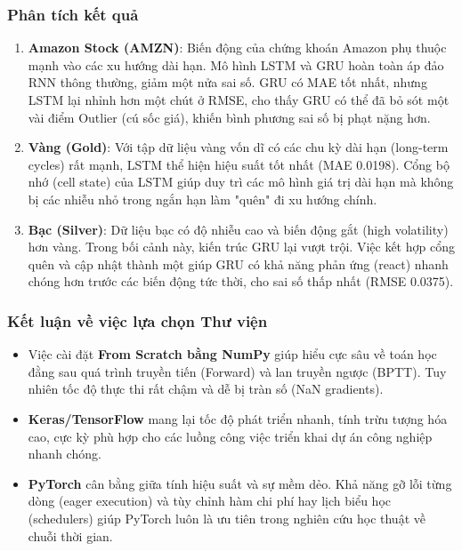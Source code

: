 \subsubsection{Phân tích kết quả}
\begin{enumerate}
    \item \textbf{Amazon Stock (AMZN)}: 
    Biến động của chứng khoán Amazon phụ thuộc mạnh vào các xu hướng dài hạn. Mô hình LSTM và GRU hoàn toàn áp đảo RNN thông thường, giảm một nửa sai số. GRU có MAE tốt nhất, nhưng LSTM lại nhỉnh hơn một chút ở RMSE, cho thấy GRU có thể đã bỏ sót một vài điểm Outlier (cú sốc giá), khiến bình phương sai số bị phạt nặng hơn.
    
    \item \textbf{Vàng (Gold)}:
    Với tập dữ liệu vàng vốn dĩ có các chu kỳ dài hạn (long-term cycles) rất mạnh, LSTM thể hiện hiệu suất tốt nhất (MAE 0.0198). Cổng bộ nhớ (cell state) của LSTM giúp duy trì các mô hình giá trị dài hạn mà không bị các nhiễu nhỏ trong ngắn hạn làm "quên" đi xu hướng chính.
    
    \item \textbf{Bạc (Silver)}:
    Dữ liệu bạc có độ nhiễu cao và biến động gắt (high volatility) hơn vàng. Trong bối cảnh này, kiến trúc GRU lại vượt trội. Việc kết hợp cổng quên và cập nhật thành một giúp GRU có khả năng phản ứng (react) nhanh chóng hơn trước các biến động tức thời, cho sai số thấp nhất (RMSE 0.0375).
\end{enumerate}

\subsubsection{Kết luận về việc lựa chọn Thư viện}
\begin{itemize}
    \item Việc cài đặt \textbf{From Scratch bằng NumPy} giúp hiểu cực sâu về toán học đằng sau quá trình truyền tiến (Forward) và lan truyền ngược (BPTT). Tuy nhiên tốc độ thực thi rất chậm và dễ bị tràn số (NaN gradients).
    \item \textbf{Keras/TensorFlow} mang lại tốc độ phát triển nhanh, tính trừu tượng hóa cao, cực kỳ phù hợp cho các luồng công việc triển khai dự án công nghiệp nhanh chóng.
    \item \textbf{PyTorch} cân bằng giữa tính hiệu suất và sự mềm dẻo. Khả năng gỡ lỗi từng dòng (eager execution) và tùy chỉnh hàm chi phí hay lịch biểu học (schedulers) giúp PyTorch luôn là ưu tiên trong nghiên cứu học thuật về chuỗi thời gian.
\end{itemize}

